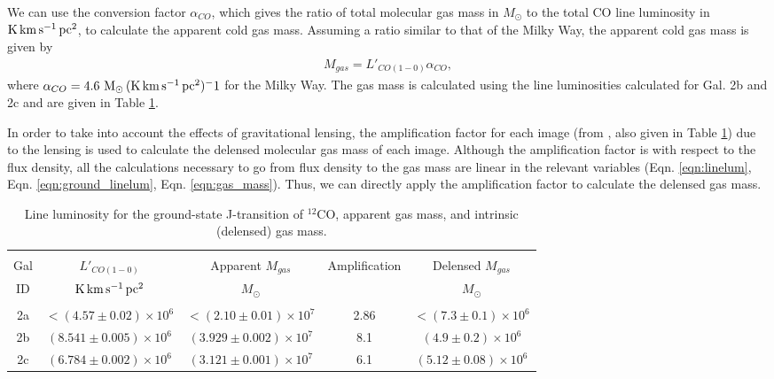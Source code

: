 \documentclass[11pt]{article}
\begin{document}
We can use the conversion factor $\alpha_{CO}$, which gives the ratio of total molecular gas mass in $M_\odot$ to the total CO line luminosity in ${\rm K\,km\,s^{-1}\,pc^2}$, to calculate the apparent cold gas mass. Assuming a ratio similar to that of the Milky Way, the apparent cold gas mass is given by 
\begin{align}\label{eqn:gas_mass}
	M_{gas} = L'_{CO(1-0)} \alpha_{CO},
\end{align}
where $\alpha_{CO} = 4.6~{\rm M_\odot\,(K\,km\,s^{-1}\,pc^2)^-1}$ for the Milky Way. The gas mass is calculated using the line luminosities calculated for Gal. 2b and 2c and are given in Table \ref{table:gas_mass}.

In order to take into account the effects of gravitational lensing, the amplification factor for each image (from \cite{MacKenzie2014}, also given in Table \ref{table:gas_mass}) due to the lensing is used to calculate the delensed molecular gas mass of each image. Although the amplification factor is with respect to the flux density, all the calculations necessary to go from flux density to the gas mass are linear in the relevant variables (Eqn. \ref{eqn:linelum}, Eqn. \ref{eqn:ground_linelum}, Eqn. \ref{eqn:gas_mass}). Thus, we can directly apply the amplification factor to calculate the delensed gas mass. 

\begin{table}[!htbp]
\centering
\begin{tabular}{ccccc}
\hline \\[-0.25cm]
Gal & $L'_{CO(1-0)}$             & Apparent $M_{gas}$ & Amplification & Delensed $M_{gas}$ \\
ID  & $\rm{K\,km\,s^{-1}\,pc^2}$ & $M_\odot$          &               & $M_\odot$          \\[0.1cm]
\hline \\[-0.25cm]
2a & $<(4.57 \pm 0.02)\times 10^{6}$  & $<(2.10 \pm 0.01)\times 10^{7}$  & 2.86 & $<(7.3 \pm 0.1)\times 10^{6}$  \\
2b & $(8.541 \pm 0.005)\times 10^{6}$ & $(3.929 \pm 0.002)\times 10^{7}$ & 8.1  & $(4.9 \pm 0.2)\times 10^{6}$ \\
2c & $(6.784 \pm 0.002)\times 10^{6}$ & $(3.121 \pm 0.001)\times 10^{7}$ & 6.1  & $(5.12 \pm 0.08)\times 10^{6}$ \\
\hline
\end{tabular}
\caption{Line luminosity for the ground-state J-transition of $^{12}$CO, apparent gas mass, and intrinsic (delensed) gas mass.}
\label{table:gas_mass}
\end{table}
\end{document}
